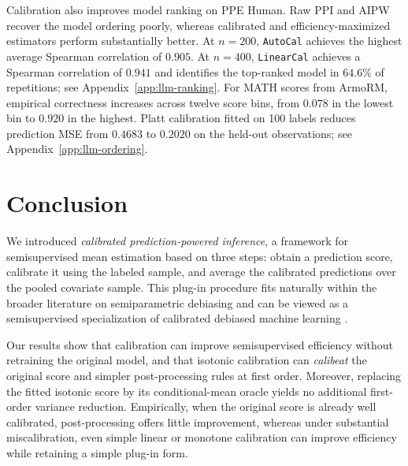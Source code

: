 \documentclass{article}
\theoremstyle{plain}
\theoremstyle{definition}
\newcommand{\1}{\mathbbm{1}}
\begin{document}
Calibration also improves model ranking on PPE Human.
Raw PPI and AIPW recover the model ordering poorly,
whereas calibrated and efficiency-maximized estimators
perform substantially better. At $n=200$, \texttt{AutoCal}
achieves the highest average Spearman correlation of $0.905$.
At $n=400$, \texttt{LinearCal} achieves a Spearman correlation
of $0.941$ and identifies the top-ranked model in $64.6\%$
of repetitions; see Appendix~\ref{app:llm-ranking}.
For MATH scores from ArmoRM, empirical correctness increases across twelve
score bins, from $0.078$ in the lowest bin to $0.920$ in the highest.
Platt calibration fitted on 100 labels reduces prediction MSE from $0.4683$
to $0.2020$ on the held-out observations; see Appendix~\ref{app:llm-ordering}.

\section{Conclusion  }

We introduced \emph{calibrated prediction-powered inference},
a framework for semisupervised mean estimation based on three
steps: obtain a prediction score, calibrate it using the labeled
sample, and average the calibrated predictions over the pooled
covariate sample. This plug-in procedure fits naturally within
the broader literature on semiparametric debiasing and can be
viewed as a semisupervised specialization of calibrated debiased
machine learning \citep{van2024automatic}.

Our results show that calibration can improve semisupervised
efficiency without retraining the original model, and that
isotonic calibration can \emph{calibeat} the original score
and simpler post-processing rules at first order. Moreover,
replacing the fitted isotonic score by its conditional-mean
oracle yields no additional first-order variance reduction. Empirically, when the original score is
already well calibrated, post-processing offers little
improvement, whereas under substantial miscalibration,
even simple linear or monotone calibration can improve
efficiency while retaining a simple plug-in form.
\end{document}
